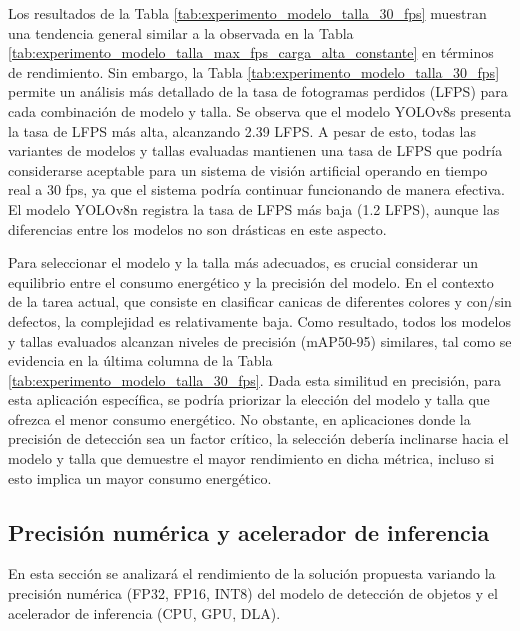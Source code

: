 \documentclass[11pt,spanish,listoffigures,listoftables]{tfgetsinf}
\begin{document}
Los resultados de la Tabla \ref{tab:experimento_modelo_talla_30_fps} muestran una tendencia general similar a la observada en la Tabla \ref{tab:experimento_modelo_talla_max_fps_carga_alta_constante} en términos de rendimiento.
Sin embargo, la Tabla \ref{tab:experimento_modelo_talla_30_fps} permite un análisis más detallado de la tasa de fotogramas perdidos (LFPS) para cada combinación de modelo y talla.
Se observa que el modelo YOLOv8s presenta la tasa de LFPS más alta, alcanzando 2.39 LFPS.
A pesar de esto, todas las variantes de modelos y tallas evaluadas mantienen una tasa de LFPS que podría considerarse aceptable para un sistema de visión artificial operando en tiempo real a 30 fps, ya que el sistema podría continuar funcionando de manera efectiva.
El modelo YOLOv8n registra la tasa de LFPS más baja (1.2 LFPS), aunque las diferencias entre los modelos no son drásticas en este aspecto.

Para seleccionar el modelo y la talla más adecuados, es crucial considerar un equilibrio entre el consumo energético y la precisión del modelo. En el contexto de la tarea actual, que consiste en clasificar canicas de diferentes colores y con/sin defectos, la complejidad es relativamente baja.
Como resultado, todos los modelos y tallas evaluados alcanzan niveles de precisión (mAP50-95) similares, tal como se evidencia en la última columna de la Tabla \ref{tab:experimento_modelo_talla_30_fps}.
Dada esta similitud en precisión, para esta aplicación específica, se podría priorizar la elección del modelo y talla que ofrezca el menor consumo energético.
No obstante, en aplicaciones donde la precisión de detección sea un factor crítico, la selección debería inclinarse hacia el modelo y talla que demuestre el mayor rendimiento en dicha métrica, incluso si esto implica un mayor consumo energético.



\subsection{Precisión numérica y acelerador de inferencia} \label{sub:precision_numerica_dispositivo}
En esta sección se analizará el rendimiento de la solución propuesta variando la precisión numérica (FP32, FP16, INT8) del modelo de detección de objetos y el acelerador de inferencia (CPU, GPU, DLA).
\end{document}
